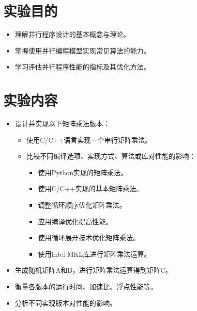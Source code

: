 \documentclass{SYSUReport}
\date{2025年3月19日}
\begin{document}
\cover
\thispagestyle{empty} %
\clearpage



\section{实验目的}
\begin{itemize}
   \item 理解并行程序设计的基本概念与理论。
    \item 掌握使用并行编程模型实现常见算法的能力。
    \item 学习评估并行程序性能的指标及其优化方法。
\end{itemize}

\section{实验内容}
\begin{itemize}
    \item 设计并实现以下矩阵乘法版本：
    \begin{itemize}
        \item 使用C/C++语言实现一个串行矩阵乘法。
        \item 比较不同编译选项、实现方式、算法或库对性能的影响：
        \begin{itemize}
            \item 使用Python实现的矩阵乘法。
            \item 使用C/C++实现的基本矩阵乘法。
            \item 调整循环顺序优化矩阵乘法。
            \item 应用编译优化提高性能。
            \item 使用循环展开技术优化矩阵乘法。
            \item 使用Intel MKL库进行矩阵乘法运算。
        \end{itemize}
    \end{itemize}
    \item 生成随机矩阵A和B，进行矩阵乘法运算得到矩阵C。
    \item 衡量各版本的运行时间、加速比、浮点性能等。
    \item 分析不同实现版本对性能的影响。
\end{itemize}
\end{document}
